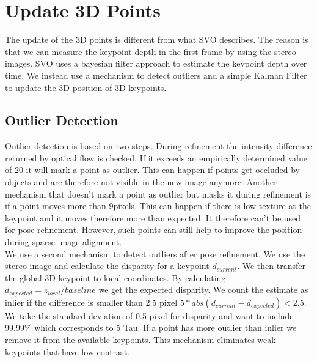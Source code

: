 \documentclass[11pt,a4paper,titlepage,oneside]{report}
\begin{document}
\section{Update 3D Points}

The update of the 3D points is different from what SVO \cite{svo} describes. The reason is that we can measure the keypoint depth in the first frame by using the stereo images. SVO uses a bayesian filter approach to estimate the keypoint depth over time. We instead use a mechanism to detect outliers and a simple Kalman Filter to update the 3D position of 3D keypoints.

\subsection{Outlier Detection}
Outlier detection is based on two steps. During refinement the intensity difference returned by optical flow is checked. If it exceeds an empirically determined value of 20 it will mark a point as outlier. This can happen if points get occluded by objects and are therefore not visible in the new image anymore. Another mechanism that doesn't mark a point as outlier but masks it during refinement is if a point moves more than 9pixels. This can happen if there is low texture at the keypoint and it moves therefore more than expected. It therefore can't be used for pose refinement. However, such points can still help to improve the position during sparse image alignment.\\
We use a second mechanism to detect outliers after pose refinement. We use the stereo image and calculate the disparity for a keypoint $d_{current}$. We then transfer the global 3D keypoint to local coordinates. By calculating $d_{expected}=z_{local}/baseline$ we get the expected disparity. We count the estimate as inlier if the difference is smaller than 2.5 pixel $5*abs(d_{current}-d_{expected})<2.5$. We take the standard deviation of 0.5 pixel for disparity and want to include 99.99\% which corresponds to 5 Tau. If a point has more outlier than inlier we remove it from the available keypoints. This mechanism eliminates weak keypoints that have low contrast.
\end{document}
